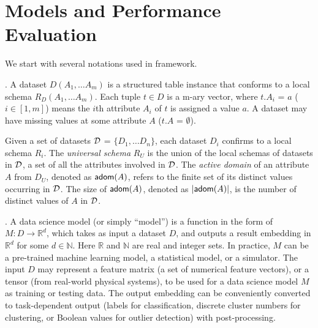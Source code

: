 \vspace{-1ex}
\section{Models and Performance Evaluation}
\label{sec:problem}

We start with several notations used in \modis framework. 

.
A dataset $D(A_1, \ldots A_m)$ is a structured 
table instance that conforms to a local 
 schema $R_D(A_1,\ldots A_m)$.  
Each tuple $t\in D$ is a m-ary vector, 
where $t.A_i$ = $a$ ($i\in [1,m]$) means 
the $i$th attribute $A_i$ of $t$ is assigned a value 
$a$. A dataset may have missing values 
at some attribute $A$ (\ie $t.A$ = $\emptyset$). 

Given a set of datasets ${\mathcal D}$ = $\{D_1, \ldots D_n\}$, each dataset $D_i$ confirms to a local schema $R_i$. 
The {\em universal schema} 
$R_U$ is the union of the local schemas of 
datasets in ${\mathcal D}$, \ie a set of
all the attributes involved in ${\mathcal D}$. 
The {\em active domain} of an attribute $A$ 
from $D_U$, denoted as ${\mathsf{adom}}(A)$, 
refers to the finite 
set of its distinct values occurring in ${\mathcal D}$. 
The size of ${\mathsf{adom}}(A)$, 
denoted as $|{\mathsf{adom}}(A)|$, is  
the number of distinct values of 
$A$ in ${\mathcal D}$.  


. A data science model (or simply ``model'') is a function 
in the form of 
$M: D \rightarrow \mathbb{R}^d$, which takes as input a 
dataset $D$,  and outputs  
a result embedding in $\mathbb{R}^d$ 
for some $d\in \mathbb{N}$. Here 
$\mathbb{R}$ and $\mathbb{N}$ 
are real and integer sets. 
In practice, 
$M$ can be a pre-trained machine learning model, 
a statistical model, or a simulator.
The input $D$ may represent a feature matrix 
(a set of numerical feature vectors), or a tensor (from real-world physical systems), to be used 
for a data science model $M$ 
as training or testing data. 
The output embedding %
can be conveniently 
converted to 
task-dependent output (\eg labels for classification, 
discrete cluster numbers for
clustering, or Boolean values
for outlier 
detection) with post-processing. 


